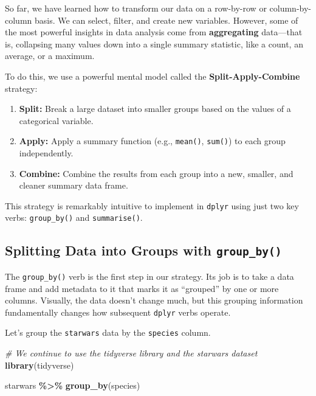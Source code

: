 \documentclass[
  11pt,
]{article}
\newenvironment{Shaded}{\begin{snugshade}}{\end{snugshade}}
\newcommand{\CommentTok}[1]{\textcolor[rgb]{0.56,0.35,0.01}{\textit{#1}}}
\newcommand{\FunctionTok}[1]{\textcolor[rgb]{0.13,0.29,0.53}{\textbf{#1}}}
\newcommand{\NormalTok}[1]{#1}
\newcommand{\SpecialCharTok}[1]{\textcolor[rgb]{0.81,0.36,0.00}{\textbf{#1}}}
\providecommand{\tightlist}{%
  \setlength{\itemsep}{0pt}\setlength{\parskip}{0pt}}
\begin{document}
So far, we have learned how to transform our data on a row-by-row or
column-by-column basis. We can select, filter, and create new variables.
However, some of the most powerful insights in data analysis come from
\textbf{aggregating} data---that is, collapsing many values down into a
single summary statistic, like a count, an average, or a maximum.

To do this, we use a powerful mental model called the
\textbf{Split-Apply-Combine} strategy:

\begin{enumerate}
\def\labelenumi{\arabic{enumi}.}
\tightlist
\item
  \textbf{Split:} Break a large dataset into smaller groups based on the
  values of a categorical variable.
\item
  \textbf{Apply:} Apply a summary function (e.g., \texttt{mean()},
  \texttt{sum()}) to each group independently.
\item
  \textbf{Combine:} Combine the results from each group into a new,
  smaller, and cleaner summary data frame.
\end{enumerate}

This strategy is remarkably intuitive to implement in \texttt{dplyr}
using just two key verbs: \texttt{group\_by()} and \texttt{summarise()}.

\subsection{\texorpdfstring{Splitting Data into Groups with
\texttt{group\_by()}}{Splitting Data into Groups with group\_by()}}\label{splitting-data-into-groups-with-group_by}

The \texttt{group\_by()} verb is the first step in our strategy. Its job
is to take a data frame and add metadata to it that marks it as
``grouped'' by one or more columns. Visually, the data doesn't change
much, but this grouping information fundamentally changes how subsequent
\texttt{dplyr} verbs operate.

Let's group the \texttt{starwars} data by the \texttt{species} column.

\begin{Shaded}
\begin{Highlighting}[]
\CommentTok{\# We continue to use the tidyverse library and the starwars dataset}
\FunctionTok{library}\NormalTok{(tidyverse)}

\NormalTok{starwars }\SpecialCharTok{\%\textgreater{}\%}
  \FunctionTok{group\_by}\NormalTok{(species)}
\end{Highlighting}
\end{Shaded}
\end{document}
